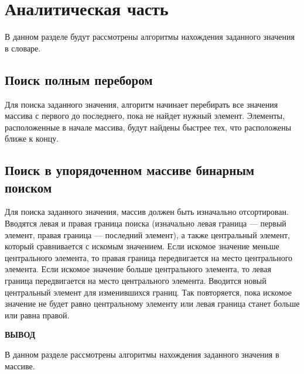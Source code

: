 \chapter{Аналитическая часть}

В данном разделе будут рассмотрены алгоритмы нахождения заданного значения в словаре.

\section{Поиск полным перебором}

Для поиска заданного значения, алгоритм начинает перебирать все значения массива с первого до последнего, пока не найдет нужный элемент. Элементы, расположенные в начале массива, будут найдены быстрее тех, что расположены ближе к концу.

\section{Поиск в упорядоченном массиве бинарным поиском}

Для поиска заданного значения, массив должен быть изначально отсортирован. Вводятся левая и правая граница поиска (изначально левая граница --- первый элемент, правая граница --- последний элемент), а также центральный элемент, который сравнивается с искомым значением. Если искомое значение меньше центрального элемента, то правая граница передвигается на место центрального элемента. Если искомое значение больше центрального элемента, то левая граница передвигается на место центрального элемента. Вводится новый центральный элемент для изменившихся границ. Так повторяется, пока искомое значение не будет равно центральному элементу или левая граница станет больше или равна правой.

\vspace{5mm}

\textbf{ВЫВОД}

В данном разделе рассмотрены алгоритмы нахождения заданного значения в массиве.